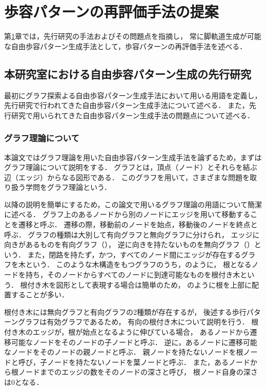 ﻿


\chapter{歩容パターンの再評価手法の提案}\label{chapter:歩容パターンの再評価手法の提案}
第\ref{chapter:歩容パターンの再評価手法の提案}章では，先行研究の手法およびその問題点を指摘し，
常に脚軌道生成が可能な自由歩容パターン生成手法として，歩容パターンの再評価手法を述べる．

\section{本研究室における自由歩容パターン生成の先行研究}
最初にグラフ探索よる自由歩容パターン生成手法において用いる用語を定義し，
先行研究で行われてきた自由歩容パターン生成手法について述べる．
また，先行研究で用いられてきた自由歩容パターン生成手法の問題点について述べる．

\subsection{グラフ理論について}
本論文ではグラフ理論を用いた自由歩容パターン生成手法を論ずるため，まずはグラフ理論について説明をする．
グラフとは，頂点（ノード）とそれらを結ぶ辺（エッジ）からなる図形である．
このグラフを用いて，さまざまな問題を取り扱う学問をグラフ理論という．

以降の説明を簡単にするため，この論文で用いるグラフ理論の用語について簡潔に述べる．
グラフ上のあるノードから別のノードにエッジを用いて移動することを遷移と呼ぶ．
遷移の際，移動前のノードを始点，移動後のノードを終点と呼ぶ．
グラフの種類は大別して有向グラフと無向グラフに分けられ，
エッジに向きがあるものを有向グラフ（），
逆に向きを持たないものを無向グラフ（）という．
また，閉路を持たず，かつ，すべてのノード間にエッジが存在するグラフを木という．
このような木構造をもつグラフのうち，のように，
根となるノードを持ち，そのノードからすべてのノードに到達可能なものを根付き木という．
根付き木を図形として表現する場合は簡単のため，
のように根を上部に配置することが多い．

根付き木には無向グラフと有向グラフの2種類が存在するが，
後述する歩行パターングラフは有効グラフであるため，
有向の根付き木について説明を行う．
根付き木のエッジが，根が始点となるように伸びている場合，
あるノードから遷移可能なノードをそのノードの子ノードと呼ぶ．
逆に，あるノードに遷移可能なノードをそのノードの親ノードと呼ぶ．
親ノードを持たないノードを根ノードと呼び，子ノードを持たないノードを葉ノードと呼ぶ．
また，あるノードから根ノードまでのエッジの数をそのノードの深さと呼び，
根ノード自身の深さは0となる．

